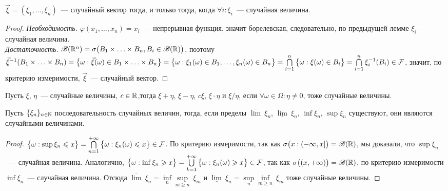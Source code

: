 \begin{lemma}
	$\vec \xi = (\xi_1, \ldots, \xi_n)$~--- случайный вектор тогда, и только тогда, когда $\forall i : \xi_i$~--- случайная величина.
	\begin{proof}
		\emph{Необходимость.} $\varphi(x_1, \ldots, x_n) = x_i$~--- непрерывная функция, значит борелевская, следовательно, по предыдущей лемме $\xi_i$~--- случайная величина. \\
		\emph{Достаточность.} $\mathscr{B}(\mathbb{R}^n) = \sigma\big(B_1 \times \ldots \times B_n, B_i \in \mathscr{B}(\mathbb{R})\big)$, поэтому $\vec\xi^{-1}(B_1 \times \ldots \times B_n) = \big\{\omega : \vec\xi(\omega) \in B_1 \times \ldots \times B_n\big\} = \big\{\omega : \xi_1(\omega) \in B_1, \ldots, \xi_n(\omega) \in B_n\big\} = \bigcap\limits_{i = 1}^n\big\{\omega: \xi(\omega) \in B_i \big\} = \bigcap\limits_{i = 1}^n \xi_i^{-1}(B_i) \in \mathcal{F}$, значит, по критерию измеримости, $\vec \xi$~--- случайный вектор.
	\end{proof}
\end{lemma}

\begin{consequence}
	Пусть $\xi$, $\eta$~--- случайные величины, $c \in \mathbb{R}$,тогда $\xi + \eta$, $\xi - \eta$, $c\xi$, $\xi \cdot \eta$ и $\xi / \eta$, если $\forall \omega \in \Omega : \eta \neq 0$, тоже случайные величины.
\end{consequence}

\begin{lemma}
	Пусть $\{ \xi_n \}_{n \in \mathbb{N}}$ последовательность случайных величин, тогда, если пределы $\overline{\lim}~\xi_n$, $\underline{\lim}~\xi_n$, $\inf\xi_n$, $\sup\xi_n$ существуют, они являются случайными величинами.
	\begin{proof}
		$\big\{\omega : \sup \xi_n \leqslant x \big\} = \bigcap\limits_{n = 1}^{+\infty}\big\{\omega : \xi_n(\omega) \leqslant x \big\} \in \mathcal{F}$. По критерию измеримости, так как $\sigma\big(x : (-\infty, x]\big) = \mathscr{B}(\mathbb{R})$, мы доказали, что $\sup\xi_n$~--- случайная величина. Аналогично, $\big\{\omega : \inf \xi_n \geqslant x \big\} = \bigcup\limits_{k = 1}^{+\infty}\big\{\omega : \xi_n(\omega) \geqslant x \big\} \in \mathcal{F}$, так как $\sigma\big((x, +\infty)\big) = \mathscr{B}(\mathbb{R})$, по критерию измеримости $\inf\xi_n$~--- случайная величина. Отсюда $\overline{\lim}~\xi_n = \inf\limits_n\sup\limits_{m \geqslant n}~\xi_m$ и $\underline{\lim}~\xi_n = \sup\limits_n\inf\limits_{m \geqslant n}~\xi_m$ тоже случайные величины.
	\end{proof}
\end{lemma}

